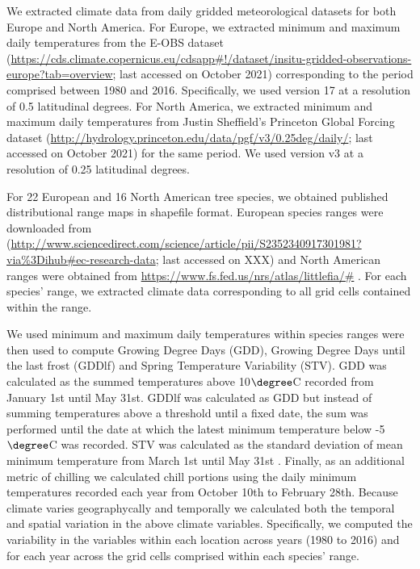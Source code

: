 \documentclass[12pt]{article}
\begin{document}
We extracted climate data  from daily gridded meteorological datasets for both Europe and North America. For Europe, we extracted minimum and maximum daily temperatures from the E-OBS dataset (\url{https://cds.climate.copernicus.eu/cdsapp#!/dataset/insitu-gridded-observations-europe?tab=overview}; last accessed on October 2021) corresponding to the period comprised between 1980 and 2016. Specifically, we used version 17 at a resolution of 0.5 latitudinal degrees. For North America, we extracted minimum and maximum daily temperatures from Justin Sheffield's Princeton Global Forcing dataset (\url{http://hydrology.princeton.edu/data/pgf/v3/0.25deg/daily/}; last accessed on October 2021) for the same period. We used version v3 at a resolution of 0.25 latitudinal degrees. 

For 22 European and 16 North American tree species, we obtained published distributional range maps in shapefile format. European species ranges were downloaded from (\url{http://www.sciencedirect.com/science/article/pii/S2352340917301981?via\%3Dihub#ec-research-data}; last accessed on XXX) \citep{Caudullo2017} and North American ranges were obtained from \url{https://www.fs.fed.us/nrs/atlas/littlefia/#} \citep{Prasad2003}. For each species' range, we extracted climate data corresponding to all grid cells contained within the range.

We used minimum and maximum daily temperatures within species ranges were then used to compute Growing Degree Days (GDD), Growing Degree Days until the last frost (GDDlf) and Spring Temperature Variability (STV). GDD was calculated as the summed temperatures above 10$\degree$C recorded from January 1st until May 31st. GDDlf was calculated as GDD but instead of summing temperatures above a threshold until a fixed date, the sum was performed until the date at which the latest minimum temperature below -5$\degree$C was recorded. STV was calculated as the standard deviation of mean minimum temperature from March 1st until May 31st \citep{Zohner:2017aa}. Finally, as an additional metric of chilling we calculated chill portions \citep{?} using the daily minimum temperatures recorded each year from October 10th to February 28th. Because climate varies geographycally and temporally we calculated both the temporal and spatial variation in the above climate variables. Specifically, we computed the variability in the variables within each location across years (1980 to 2016) and for each year across the grid cells comprised within each species' range.
  
\end{document}
